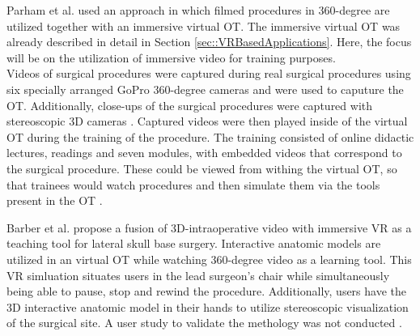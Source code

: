 Parham et al. \cite{Parham.2019} used an approach in which filmed procedures in 360-degree are utilized together with an immersive virtual OT.
The immersive virtual OT was already described in detail in Section \ref{sec::VRBasedApplications}. Here, the focus will be on the utilization of immersive 
video for training purposes.
\\ Videos of surgical procedures were captured during real surgical procedures using six specially arranged GoPro 360-degree cameras and were used to caputure the OT.
Additionally, close-ups of the surgical procedures were captured with stereoscopic 3D cameras \cite{Parham.2019}.
Captured videos were then played inside of the virtual OT during the training of the procedure.
The training consisted of online didactic lectures, readings and seven modules, with embedded videos that correspond to the surgical procedure.
These could be viewed from withing the virtual OT, so that trainees would watch procedures and then simulate them via the tools present in the OT \cite{Parham.2019}.

Barber et al. \cite{Barber.2020} propose a fusion of 3D-intraoperative 
video with immersive VR as a teaching tool for lateral skull base surgery.
Interactive anatomic models are utilized in an virtual OT while watching 
360-degree video as a learning tool.
This VR simluation situates users in the lead surgeon's chair while 
simultaneously being able to pause, stop and rewind the procedure.
Additionally, users have the 3D interactive anatomic model in their 
hands to utilize stereoscopic visualization of the surgical 
site. A user study to validate the 
methology was not conducted \cite{Barber.2020}.

